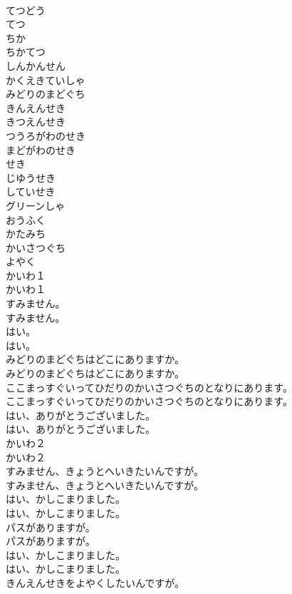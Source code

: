 \documentclass[8pt]{extreport}
\begin{document}
\begin{CJK}{UTF8}{min}
\\	てつどう
\\	てつ
\\	ちか
\\	ちかてつ
\\	しんかんせん
\\	かくえきていしゃ
\\	みどりのまどぐち
\\	きんえんせき
\\	きつえんせき
\\	つうろがわのせき
\\	まどがわのせき
\\	せき
\\	じゆうせき
\\	していせき
\\	グリーンしゃ
\\	おうふく
\\	かたみち
\\	かいさつぐち
\\	よやく
\\	かいわ１	
\\	かいわ１ 
\\	すみません。	
\\	すみません。 
\\	はい。	
\\	はい。 
\\	みどりのまどぐちはどこにありますか。	
\\	みどりのまどぐちはどこにありますか。 
\\	ここまっすぐいってひだりのかいさつぐちのとなりにあります。	
\\	ここまっすぐいってひだりのかいさつぐちのとなりにあります。 
\\	はい、ありがとうございました。	
\\	はい、ありがとうございました。 
\\	かいわ２	
\\	かいわ２ 
\\	すみません、きょうとへいきたいんですが。	
\\	すみません、きょうとへいきたいんですが。 
\\	はい、かしこまりました。	
\\	はい、かしこまりました。 
\\	パスがありますが。	
\\	パスがありますが。 
\\	はい、かしこまりました。	
\\	はい、かしこまりました。 
\\	きんえんせきをよやくしたいんですが。	

\end{CJK}
\end{document}
